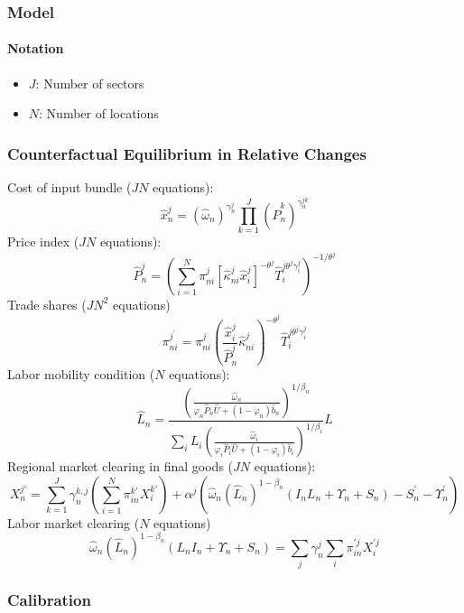 \subsubsection{Model}
\paragraph{Notation}
\begin{itemize}
    \item $J$: Number of sectors
    \vspace{-2mm}
    \item $N$: Number of locations
\end{itemize}


\subsubsection{Counterfactual Equilibrium in Relative Changes}

Cost of input bundle ($J N$ equations):
\begin{equation}
\hat{x}_n^j=\left(\hat{\omega}_n\right)^{\gamma_n^j} \prod_{k=1}^J\left(\hat{P}_n^k\right)^{\gamma_n^{j k}}
\end{equation}
%
Price index ($J N$ equations):
\begin{equation}
\hat{P}_n^j=\left(\sum_{i=1}^N \pi_{n i}^j\left[\hat{\kappa}_{n i}^j \hat{x}_i^j\right]^{-\theta^j} \hat{T}_i^{j \theta^j \gamma_i^j}\right)^{-1 / \theta^j}
\end{equation}
%
Trade shares ($J N^2$ equations)
\begin{equation}
\pi_{n i}^{j^{\prime}}=\pi_{n i}^j\left(\frac{\hat{x}_i^j}{\hat{P}_n^j} \hat{\kappa}_{n i}^j\right)^{-\theta^j} \hat{T}_i^{j \theta^j \gamma_i^j}
\end{equation}
%
Labor mobility condition ($N$ equations):
\begin{equation}
\hat{L}_n=\frac{\left(\frac{\hat{\omega}_n}{\varphi_n \hat{P}_n \hat{U}+\left(1-\varphi_n\right) \hat{b}_n}\right)^{1 / \beta_n}}{\sum_i L_i\left(\frac{\hat{\omega}_i}{\varphi_i \hat{P}_i \hat{U}+\left(1-\varphi_i\right) \hat{b}_i}\right)^{1 / \beta_i}} L
\end{equation}
%
Regional market clearing in final goods ($J N$ equations):
\begin{equation}
X_n^{j \prime}=\sum_{k=1}^J \gamma_n^{k, j}\left(\sum_{i=1}^N \pi_{i n}^{k \prime} X_i^{k \prime}\right)+\alpha^j\left(\hat{\omega}_n\left(\hat{L}_n\right)^{1-\beta_n}\left(I_n L_n+\Upsilon_n+S_n\right)-S_n^{\prime}-\Upsilon_n^{\prime}\right)
\end{equation}
%
Labor market clearing ($N$ equations)
\begin{equation}
\hat{\omega}_n\left(\hat{L}_n\right)^{1-\beta_n}\left(L_n I_n+\Upsilon_n+S_n\right)=\sum_j \gamma_n^j \sum_i \pi_{i n}^{\prime j} X_i^{\prime j}
\end{equation}


\subsubsection{Calibration}


